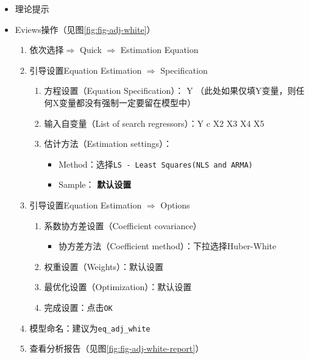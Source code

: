 \documentclass[12pt,(landscape,a4paper),(portrait,a4paper)]{article}
\providecommand{\tightlist}{%
  \setlength{\itemsep}{0pt}\setlength{\parskip}{0pt}}
\begin{document}
\begin{itemize}
\item
  理论提示
\item
  Eviews操作（见图\ref{fig:fig-adj-white}）

  \begin{enumerate}
  \def\labelenumi{\arabic{enumi})}
  \tightlist
  \item
    依次选择\(\Rightarrow\) Quick \(\Rightarrow\) Estimation Equation\\
  \item
    引导设置Equation Estimation \(\Rightarrow\) Specification

    \begin{enumerate}
    \def\labelenumii{\alph{enumii}.}
    \tightlist
    \item
      方程设置（Equation Specification）： Y
      （此处如果仅填Y变量，则任何X变量都没有强制一定要留在模型中）
    \item
      输入自变量（List of search regressors）：Y c X2 X3 X4 X5
    \item
      估计方法（Estimation settings）：

      \begin{itemize}
      \tightlist
      \item
        Method：选择\texttt{LS\ -\ Least\ Squares(NLS\ and\ ARMA)}
      \item
        Sample： \textbf{默认设置}
      \end{itemize}
    \end{enumerate}
  \item
    引导设置Equation Estimation \(\Rightarrow\) Options

    \begin{enumerate}
    \def\labelenumii{\alph{enumii}.}
    \tightlist
    \item
      系数协方差设置（Coefficient covariance）

      \begin{itemize}
      \tightlist
      \item
        协方差方法（Coefficient method）：下拉选择Huber-White
      \end{itemize}
    \item
      权重设置（Weights）：默认设置
    \item
      最优化设置（Optimization）：默认设置
    \item
      完成设置：点击\texttt{OK}\\
    \end{enumerate}
  \item
    模型命名：建议为\texttt{eq\_adj\_white}\\
  \item
    查看分析报告（见图\ref{fig:fig-adj-white-report}）
  \end{enumerate}
\end{itemize}
\end{document}
